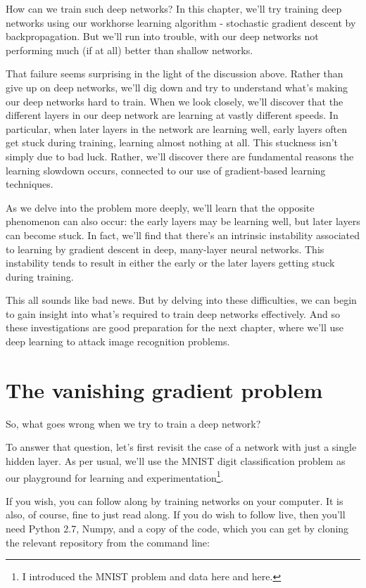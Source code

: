 \documentclass[a4paper,twoside,10pt]{book}
\begin{document}
How can we train such deep networks? In this chapter, we'll try training deep networks using our workhorse learning algorithm - stochastic gradient descent by backpropagation. But we'll run into trouble, with our deep networks not performing much (if at all) better than shallow networks.

That failure seems surprising in the light of the discussion above. Rather than give up on deep networks, we'll dig down and try to understand what's making our deep networks hard to train. When we look closely, we'll discover that the different layers in our deep network are learning at vastly different speeds. In particular, when later layers in the network are learning well, early layers often get stuck during training, learning almost nothing at all. This stuckness isn't simply due to bad luck. Rather, we'll discover there are fundamental reasons the learning slowdown occurs, connected to our use of gradient-based learning techniques.

As we delve into the problem more deeply, we'll learn that the opposite phenomenon can also occur: the early layers may be learning well, but later layers can become stuck. In fact, we'll find that there's an intrinsic instability associated to learning by gradient descent in deep, many-layer neural networks. This instability tends to result in either the early or the later layers getting stuck during training.

This all sounds like bad news. But by delving into these difficulties, we can begin to gain insight into what's required to train deep networks effectively. And so these investigations are good preparation for the next chapter, where we'll use deep learning to attack image recognition problems.

\section{The vanishing gradient problem}
So, what goes wrong when we try to train a deep network?

To answer that question, let's first revisit the case of a network with just a single hidden layer. As per usual, we'll use the MNIST digit classification problem as our playground for learning and experimentation\footnote{I introduced the MNIST problem and data here and here.}.

If you wish, you can follow along by training networks on your computer. It is also, of course, fine to just read along. If you do wish to follow live, then you'll need Python 2.7, Numpy, and a copy of the code, which you can get by cloning the relevant repository from the command line:
\end{document}
